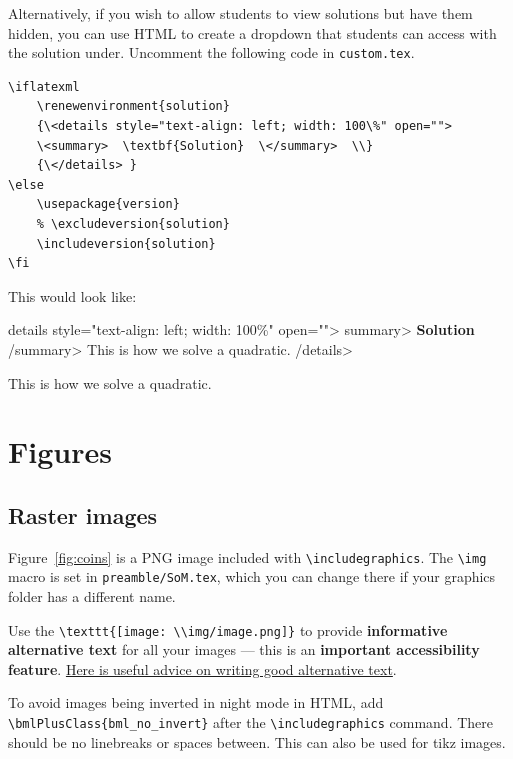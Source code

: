 Alternatively, if you wish to allow students to view solutions but have them hidden, you can use HTML to create a dropdown that students can access with the solution under. Uncomment the following code in \verb|custom.tex|.

\begin{lstlisting}
\iflatexml  
    \renewenvironment{solution} 
    {\<details style="text-align: left; width: 100\%" open="">  
    \<summary>  \textbf{Solution}  \</summary>  \\} 
    {\</details> } 
\else 
    \usepackage{version}  
    % \excludeversion{solution}  
    \includeversion{solution}  
\fi 
\end{lstlisting}

This would look like:

\iflatexml  
\<details style="text-align: left; width: 100\%" open="">  \<summary>  \textbf{Solution}  \</summary>  This is how we solve a quadratic.  
    \</details> 
\else 
    \begin{solution}
        This is how we solve a quadratic. 
    \end{solution} 
\fi 




\section{Figures}
\label{demo:fig}

\subsection{Raster images}
\label{demo:fig:raster}

Figure~\ref{fig:coins} is a PNG image included with \verb|\includegraphics|. The \verb|\img| macro is set in \verb|preamble/SoM.tex|, which you can change there if your graphics folder has a different name.

Use the \verb|\texttt{[image: \\img/image.png]}| to provide \textbf{informative alternative text} for all your images --- this is an \textbf{important accessibility feature}. \href{https://accessibility.huit.harvard.edu/describe-content-images}{Here is useful advice on writing good alternative text}.

To avoid images being inverted in night mode in HTML, add \verb|\bmlPlusClass{bml_no_invert}| after the \verb|\includegraphics| command. There should be no linebreaks or spaces between. This can also be used for tikz images.

